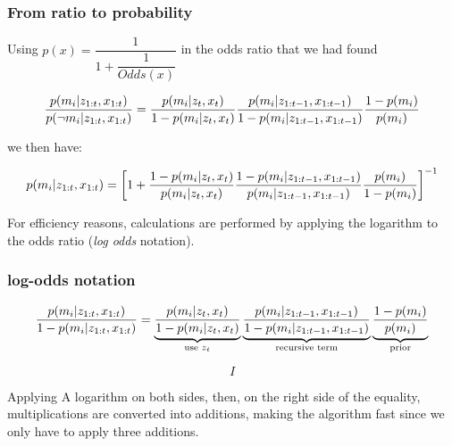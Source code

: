     
    \begin{frame}
     \frametitle{From ratio to probability}
    
     Using $p(x) = \dfrac{1}{1 + \dfrac{1}{Odds(x)}}$ in the odds ratio that we had found
    
     \begin{equation*}
     \dfrac{p(m _{i}| z _{1:t}, x _{1:t})}{p(\neg m _{i}| z _{1:t}, x _{1:t})} = \dfrac{p(m _{i} | z _{t}, x _{t})}{1 - p(m _{i} | z _{t}, x _{t})}
     \dfrac{p(m _{i} | z _{1:t-1}, x _{1:t-1})}{1- p(m _{i} | z _{1:t-1}, x _{1:t-1})}
     \dfrac{1 - p(m_{i})} {p(m_{i})}
     \end{equation*}
    
    we then have:
    
     \begin{equation*}
     p(m_{i}| z _{1:t}, x _{1:t}) =
     \left[
     1 +
     \dfrac{1 - p(m _{i} | z _{t}, x _{t})}{p(m _{i} | z _{t}, x _{t})}
     \dfrac{1- p(m_{i} | z_{1:t-1}, x_{1:t-1})}{p(m_{i} | z_{1:t-1}, x_{1:t-1})}
    \dfrac{p(m_{i})}{1 - p(m_{i})}
    \right]^{-1}
    \end{equation*}
    
    For efficiency reasons, calculations are performed by applying the logarithm to the odds ratio (\emph{log odds} notation).
\end{frame}

\begin{frame}
    \frametitle{log-odds notation}
    \begin{equation*}
    \dfrac{p(m _{i}| z _{1:t}, x _{1:t})}{1 - p(m _{i}| z _{1:t}, x _{1:t})} = \underbrace{\dfrac{p(m _{i} | z _{t}, x _{t})}{1 - p(m _{i} | z _{t}, x_{t})}}_{\text{use } z_{t}}
    \underbrace{\dfrac{p(m_{i} | z_{1:t-1}, x _{1:t-1})}{1- p(m _{i} | z _{1:t-1}, x _{1:t-1})}}_{\text{recursive term}}
    \underbrace{\dfrac{1 - p(m _{i})} {p(m _{i})}}_{\text{prior}}
    \end{equation*}
   
    \begin{equation*}
    I
    \end{equation*}
   
    Applying A logarithm on both sides, then, on the right side of the equality, multiplications are converted into additions, making the algorithm fast since we only have to apply three additions.
   
   \end{frame}
   

